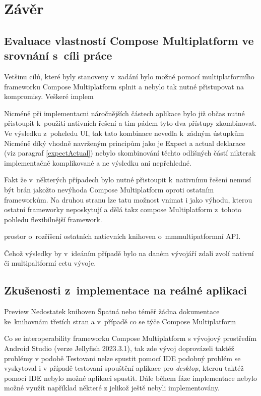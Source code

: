 \chapter{Závěr}

\section{Evaluace vlastností Compose Multiplatform ve srovnání s~cíli práce}
Vetšinu cílů, které byly stanoveny v~zadání bylo možné pomocí multiplatformího frameworku Compose Multiplatform splnit a nebylo tak
nutné přistupovat na kompromisy. Veškeré implem

Nicméně při implementacni náročnějších částech aplikace bylo již občas nutné přistoupit k~použití nativních řešení a tím pádem tyto dva přístupy zkombinovat.
Ve výsledku z~poheledu UI, tak tato kombinace nevedla k~zádným ústupkům
Nicméně díký vhodně navrženým principům jako je Expect a actual deklarace (viz paragraf \ref{expectActual}) nebylo skombinování těchto odlišných částí nikterak
implementačně komplikované a ne výsledku ani nepřehledné. 

Fakt že v~některých případech bylo nutné přistoupit k~nativnímu řešení nemusí být brán jakožto nevýhoda Compose Multiplatform oproti ostatním frameworkům.
Na druhou stranu lze tatu možnost vnimat i jako výhodu, kterou ostatní frameworky neposkytují a dělá takz compose Multiplatform z~tohoto pohledu flexibilnější
framework.

prostor o~rozříšení ostatních naticvních knihoven o~mmmultipatformní API. 

Čehož výsledky by v~ideáním případě bylo na daném vývojáří zdali zvolí nativní či multipaltformí cetu vývoje. 

\section{Zkušenosti z~implementace na reálné aplikaci}
Preview
Nedostatek knihoven
Špatná nebo téměř žádna dokumentace ke~knihovnám třetích stran a v~případě co se týče Compose Multiplatform

Co se interoperability frameworku Compose Multiplatform s vývojový prostředím Android Studio (verze Jellyfish 2023.3.1), tak zde vývoj doprovázeli 
taktéž problémy v podobě 
Testovani nelze spustit pomocí IDE podobný problém se vyskytoval i v případě testovaní spouštění aplikace pro \textit{desktop}, kterou taktéž pomocí
IDE nebylo možné aplikaci spustit.
Dále během fáze implementace nebylo možné využít například některé z  jelikož ještě nebyli implementovány.


